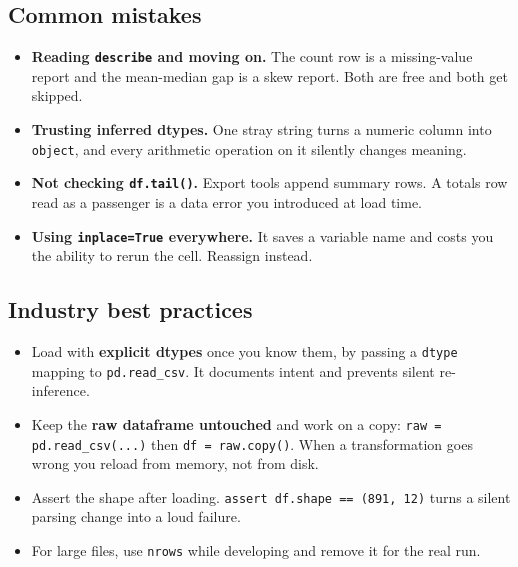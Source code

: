 \documentclass[11pt,a4paper]{article}
\begin{document}

\subsection*{Common mistakes}

\begin{itemize}\itemsep3pt
  \item \textbf{Reading \lstinline|describe| and moving on.} The count row is a missing-value
        report and the mean-median gap is a skew report. Both are free and both get skipped.
  \item \textbf{Trusting inferred dtypes.} One stray string turns a numeric column into
        \lstinline|object|, and every arithmetic operation on it silently changes meaning.
  \item \textbf{Not checking \lstinline|df.tail()|.} Export tools append summary rows.
        A totals row read as a passenger is a data error you introduced at load time.
  \item \textbf{Using \lstinline|inplace=True| everywhere.} It saves a variable name and
        costs you the ability to rerun the cell. Reassign instead.
\end{itemize}

\subsection*{Industry best practices}

\begin{itemize}\itemsep3pt
  \item Load with \textbf{explicit dtypes} once you know them, by passing a
        \lstinline|dtype| mapping to \lstinline|pd.read_csv|. It documents intent and
        prevents silent re-inference.
  \item Keep the \textbf{raw dataframe untouched} and work on a copy:
        \lstinline|raw = pd.read_csv(...)| then \lstinline|df = raw.copy()|. When a
        transformation goes wrong you reload from memory, not from disk.
  \item Assert the shape after loading. \lstinline|assert df.shape == (891, 12)| turns a
        silent parsing change into a loud failure.
  \item For large files, use \lstinline|nrows| while developing and remove it for the real
        run.
\end{itemize}
\end{document}
